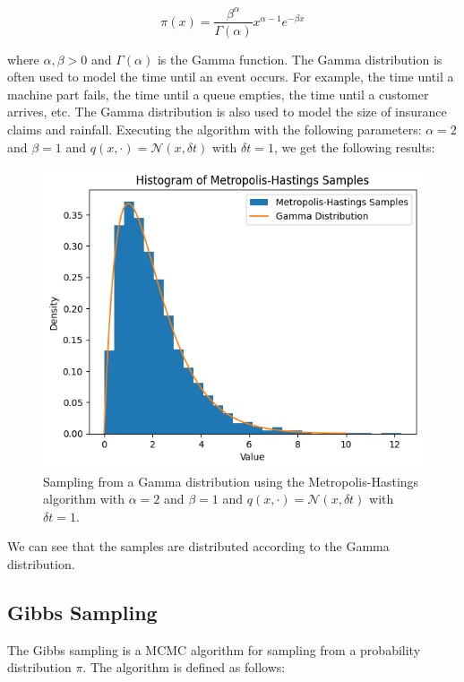 \documentclass{report}
\begin{document}
\[
	\pi(x) = \frac{\beta^\alpha}{\Gamma(\alpha)} x^{\alpha - 1} e^{-\beta x}
\]

where $\alpha, \beta > 0$ and $\Gamma(\alpha)$ is the Gamma function. The Gamma distribution is often used to model the time until an event occurs. For example, the time until a machine part fails, the time until a queue empties, the time until a customer arrives, etc. The Gamma distribution is also used to model the size of insurance claims and rainfall. Executing the algorithm with the following parameters: $\alpha = 2$ and $\beta = 1$ and $q(x, \cdot) = \mathcal{N}(x, \delta t)$ with $\delta t = 1$, we get the following results:

\begin{figure}[H]
	\centering
	\includegraphics[width=0.5\linewidth]{./Figures/MCMC/gamma.png}
	\caption{Sampling from a Gamma distribution using the Metropolis-Hastings algorithm with $\alpha = 2$ and $\beta = 1$ and $q(x, \cdot) = \mathcal{N}(x, \delta t)$ with $\delta t = 1$.}
	\label{fig:gamma}
\end{figure}

We can see that the samples are distributed according to the Gamma distribution.


\subsection{Gibbs Sampling}
\label{sec:gibbs_sampling}

The Gibbs sampling is a MCMC algorithm for sampling from a probability distribution $\pi$. The algorithm is defined as follows:
\end{document}
